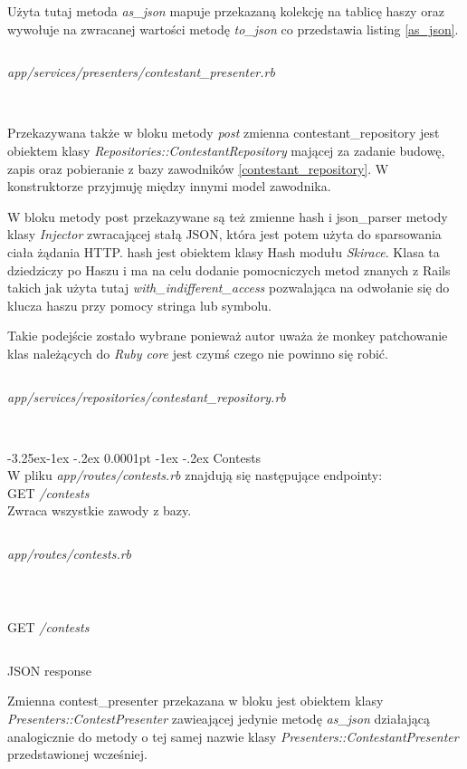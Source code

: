 \documentclass[11pt,a4paper, twoside]{article}
\makeatletter
\renewcommand\subparagraph{\@startsection{paragraph}{6}{\z@} %
	{-3.25ex\@plus -1ex \@minus -.2ex} %
	{0.0001pt \@plus -1ex \@minus -.2ex} %
	{\normalfont\normalsize}}
\makeatother
\begin{document}
Użyta tutaj metoda \emph{as\_json} mapuje przekazaną kolekcję na tablicę haszy oraz wywołuje na zwracanej wartości metodę \emph{to\_json} co przedstawia listing \ref{as_json}.
\begin{listing}
\inputminted{ruby}{./src/contestants_as_json.rb}
\caption{\emph{app/services/presenters/contestant\_presenter.rb}}
$\label{as_json}$
\end{listing}


Przekazywana także w bloku metody \emph{post} zmienna contestant\_repository jest obiektem klasy \emph{Repositories::ContestantRepository} mającej za zadanie budowę, zapis oraz pobieranie z bazy zawodników \ref{contestant_repository}. W konstruktorze przyjmuję między innymi model zawodnika. %

W bloku metody post przekazywane są też zmienne hash i json\_parser metody klasy \emph{Injector} zwracającej stałą JSON, która jest potem użyta do sparsowania ciała żądania HTTP. hash jest obiektem klasy Hash modułu \emph{Skirace}. Klasa ta dziedziczy po Haszu i ma na celu dodanie pomocniczych metod znanych z Rails takich jak użyta tutaj \emph{with\_indifferent\_access} pozwalająca na odwołanie się do klucza haszu przy pomocy stringa lub symbolu. 

Takie podejście zostało wybrane ponieważ autor uważa że monkey patchowanie klas należących do \emph{Ruby core} jest czymś czego nie powinno się robić. 
\begin{listing}
\inputminted{ruby}{../app/services/repositories/contestant_repository.rb}
\caption{\emph{app/services/repositories/contestant\_repository.rb}}
$\label{contestant_repository}$
\end{listing}
\clearpage
\subparagraph{Contests} ~\\
W pliku \emph{app/routes/contests.rb} znajdują się następujące endpointy:
\\
GET \emph{/contests}
\\
\noindent
Zwraca wszystkie zawody z bazy.
\begin{listing}
\inputminted{ruby}{./src/get_contests.rb}
\caption{\emph{app/routes/contests.rb}}
$\label{contests}$
\end{listing}
\begin{listing}
\inputminted{ruby}{./src/curl_contests}
\caption{GET \emph{/contests}}
\end{listing}
\begin{listing}
\inputminted{ruby}{./src/curl_contests_resp}
\caption{JSON response}
\end{listing}
Zmienna contest\_presenter przekazana w bloku jest obiektem klasy \emph{Presenters::ContestPresenter} zawieającej jedynie metodę \emph{as\_json} działającą analogicznie do metody o tej samej nazwie klasy \emph{Presenters::ContestantPresenter} przedstawionej wcześniej.
\end{document}
